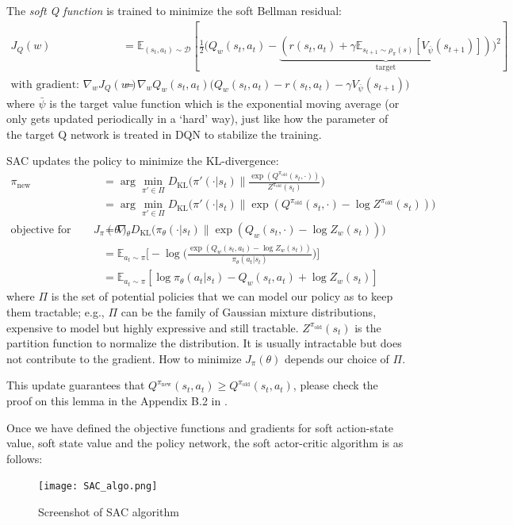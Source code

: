 \documentclass[lang=en,mode=normal,device=normal,color=blue,12pt]{elegantnote}
\DeclareMathOperator*{\1}{\mathbbm{1}}
\begin{document}
The \textit{soft Q function} is trained to minimize the soft Bellman residual:
\begin{align*}
J_Q(w) &= \mathbb{E}_{(s_t, a_t) \sim \mathcal{D}} [\frac{1}{2}\big( Q_w(s_t, a_t) - \underbrace{(r(s_t, a_t) + \gamma \mathbb{E}_{s_{t+1} \sim \rho_\pi(s)}[V_{\bar{\psi}}(s_{t+1})])}_\text{target} \big)^2] \\
\text{with gradient: } \nabla_w J_Q(w) &= \nabla_w Q_w(s_t, a_t) \big( Q_w(s_t, a_t) - r(s_t, a_t) - \gamma V_{\bar{\psi}}(s_{t+1})\big)
\end{align*}
where $\bar{\psi}$ is the target value function which is the exponential moving average (or only gets updated periodically in a `hard' way), just like how the parameter of the target Q network is treated in DQN to stabilize the training.

SAC updates the policy to minimize the KL-divergence:
\begin{align*}
\pi_\text{new} 
&= \arg\min_{\pi' \in \Pi} D_\text{KL} \Big( \pi'(\cdot | s_t) \| \frac{\exp(Q^{\pi_\text{old}}(s_t, \cdot))}{Z^{\pi_\text{old}}(s_t)} \Big) \\[6pt]
&= \arg\min_{\pi' \in \Pi} D_\text{KL} \big( \pi'(\cdot | s_t) \| \exp(Q^{\pi_\text{old}}(s_t, \cdot) - \log Z^{\pi_\text{old}}(s_t)) \big) \\[6pt]
\text{objective for update: } J_\pi(\theta) &= \nabla_\theta D_\text{KL} \big( \pi_\theta(\cdot | s_t) \| \exp(Q_w(s_t, \cdot) - \log Z_w(s_t)) \big) \\[6pt]
&= \mathbb{E}_{a_t\sim\pi} \Big[ - \log \big( \frac{\exp(Q_w(s_t, a_t) - \log Z_w(s_t))}{\pi_\theta(a_t | s_t)} \big) \Big] \\[6pt]
&= \mathbb{E}_{a_t\sim\pi} [ \log \pi_\theta(a_t | s_t) - Q_w(s_t, a_t) + \log Z_w(s_t) ]
\end{align*}
where $\Pi$ is the set of potential policies that we can model our policy as to keep them tractable; e.g., $\Pi$ can be the family of Gaussian mixture distributions, expensive to model but highly expressive and still tractable.
$Z^{\pi_{\text{old}}}(s_t)$ is the partition function to normalize the distribution.
It is usually intractable but does not contribute to the gradient. How to minimize $J_\pi (\theta)$ depends our choice of $\Pi$.

This update guarantees that $Q^{\pi_\text{new}}(s_t, a_t) \geq Q^{\pi_\text{old}}(s_t, a_t)$, please check the proof on this lemma in the Appendix B.2 in \cite{haarnoja2018soft}.

Once we have defined the objective functions and gradients for soft action-state value, soft state value and the policy network, the soft actor-critic algorithm is as follows:
\begin{figure}[h!]
  \centering
  \texttt{[image: SAC\_algo.png]}
  \caption{Screenshot of SAC algorithm}
  \label{fig:SAC_algo}
\end{figure}
\end{document}
